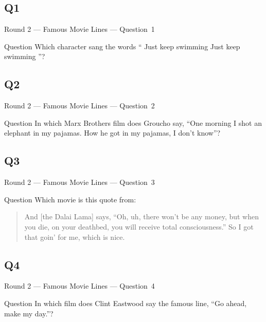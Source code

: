\documentclass[11pt]{beamer}
\begin{document}
\subsection*{Q1}
\begin{frame}[t]{Round 2 --- Famous Movie Lines --- \mbox{Question 1}}
\vspace{-0.5em}
\begin{block}{Question}
Which character sang the words ``\Acht{} Just keep swimming \AAcht{} Just keep swimming \Acht{}''?
\end{block}
\end{frame}
\subsection*{Q2}
\begin{frame}[t]{Round 2 --- Famous Movie Lines --- \mbox{Question 2}}
\vspace{-0.5em}
\begin{block}{Question}
In which Marx Brothers film does Groucho say, ``One morning I shot an elephant in my pajamas. How he got in my pajamas, I don't know''?
\end{block}
\end{frame}
\subsection*{Q3}
\begin{frame}[t]{Round 2 --- Famous Movie Lines --- \mbox{Question 3}}
\vspace{-0.5em}
\begin{block}{Question}
Which movie is this quote from:\par\begin{quote}And [the Dalai Lama] says, ``Oh, uh, there won't be any money, but when you die, on your deathbed, you will receive total consciousness.'' So I got that goin' for me, which is nice.\end{quote}
\end{block}
\end{frame}
\subsection*{Q4}
\begin{frame}[t]{Round 2 --- Famous Movie Lines --- \mbox{Question 4}}
\vspace{-0.5em}
\begin{block}{Question}
In which film does Clint Eastwood say the famous line, ``Go ahead, make my day.''?
\end{block}
\end{frame}
\end{document}
